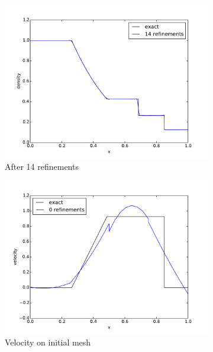 \documentclass[preprint,12pt]{elsarticle}
\begin{document}
\begin{figure}[p]
\begin{subfigure}[c]{0.3\textwidth}
\includegraphics[width=\textwidth]{SpaceTimeCNS/Sod1e-5/den15.pdf}
\caption{After 14 refinements}
\label{fig:sod_den14}
\end{subfigure}
\begin{subfigure}[c]{0.3\textwidth}
\centering
\includegraphics[width=\textwidth]{SpaceTimeCNS/Sod1e-5/vel1.pdf}
\caption{Velocity on initial mesh}
\label{fig:sod_vel0}
\end{subfigure}
\begin{subfigure}[c]{0.3\textwidth}
\centering

\end{subfigure}
\end{figure}
\end{document}

